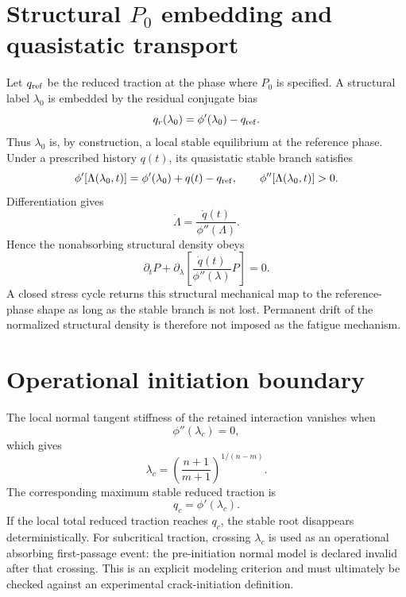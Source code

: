 \documentclass[11pt]{article}
\begin{document}
\section{Structural $P_0$ embedding and quasistatic transport}
Let $q_{\rm ref}$ be the reduced traction at the phase where $P_0$ is specified. A structural label $\lambda_0$ is embedded by the residual conjugate bias
\begin{equation}
q_r(\lambda_0)=\phi'(\lambda_0)-q_{\rm ref}.
\label{eq:qr}
\end{equation}
Thus $\lambda_0$ is, by construction, a local stable equilibrium at the reference phase. Under a prescribed history $q(t)$, its quasistatic stable branch satisfies
\begin{equation}
\phi'[\Lambda(\lambda_0,t)]
=\phi'(\lambda_0)+q(t)-q_{\rm ref},
\qquad
\phi''[\Lambda(\lambda_0,t)]>0.
\label{eq:stablemap}
\end{equation}
Differentiation gives
\begin{equation}
\dot\Lambda
=\frac{\dot q(t)}{\phi''(\Lambda)}.
\label{eq:charvel}
\end{equation}
Hence the nonabsorbing structural density obeys
\begin{equation}
\partial_tP+
\partial_\lambda\left[
\frac{\dot q(t)}{\phi''(\lambda)}P
\right]=0.
\label{eq:structtransport}
\end{equation}
A closed stress cycle returns this structural mechanical map to the reference-phase shape as long as the stable branch is not lost. Permanent drift of the normalized structural density is therefore not imposed as the fatigue mechanism.

\section{Operational initiation boundary}
The local normal tangent stiffness of the retained interaction vanishes when
\begin{equation}
\phi''(\lambda_c)=0,
\end{equation}
which gives
\begin{equation}
\lambda_c=\left(\frac{n+1}{m+1}\right)^{1/(n-m)}.
\label{eq:lambdac}
\end{equation}
The corresponding maximum stable reduced traction is
\begin{equation}
q_c=\phi'(\lambda_c).
\end{equation}
If the local total reduced traction reaches $q_c$, the stable root disappears deterministically. For subcritical traction, crossing $\lambda_c$ is used as an operational absorbing first-passage event: the pre-initiation normal model is declared invalid after that crossing. This is an explicit modeling criterion and must ultimately be checked against an experimental crack-initiation definition.
\end{document}
